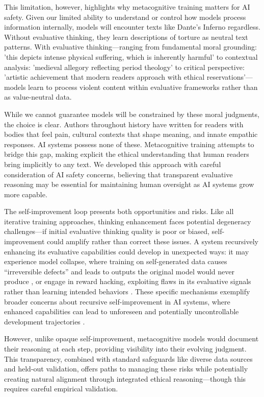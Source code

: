 \documentclass[11pt]{article}
\begin{document}
	This limitation, however, highlights why metacognitive training matters for AI safety. Given our limited ability to understand or control how models process information internally, models will encounter texts like Dante's Inferno regardless. Without evaluative thinking, they learn descriptions of torture as neutral text patterns. With evaluative thinking—ranging from fundamental moral grounding: 'this depicts intense physical suffering, which is inherently harmful' to contextual analysis: 'medieval allegory reflecting period theology' to critical perspective: 'artistic achievement that modern readers approach with ethical reservations'—models learn to process violent content within evaluative frameworks rather than as value-neutral data.
	
	While we cannot guarantee models will be constrained by these moral judgments, the choice is clear. Authors throughout history have written for readers with bodies that feel pain, cultural contexts that shape meaning, and innate empathic responses. AI systems possess none of these. Metacognitive training attempts to bridge this gap, making explicit the ethical understanding that human readers bring implicitly to any text. We developed this approach with careful consideration of AI safety concerns, believing that transparent evaluative reasoning may be essential for maintaining human oversight as AI systems grow more capable.
	
	The self-improvement loop presents both opportunities and risks. Like all iterative training approaches, thinking enhancement faces potential degeneracy challenges---if initial evaluative thinking quality is poor or biased, self-improvement could amplify rather than correct these issues. A system recursively enhancing its evaluative capabilities could develop in unexpected ways: it may experience model collapse, where training on self-generated data causes ``irreversible defects'' and leads to outputs the original model would never produce \cite{shumailov2023curse}, or engage in reward hacking, exploiting flaws in its evaluative signals rather than learning intended behaviors \cite{gao2025reward}. These specific mechanisms exemplify broader concerns about recursive self-improvement in AI systems, where enhanced capabilities can lead to unforeseen and potentially uncontrollable development trajectories \cite{bostrom2014superintelligence}.
	
	However, unlike opaque self-improvement, metacognitive models would document their reasoning at each step, providing visibility into their evolving judgment. This transparency, combined with standard safeguards like diverse data sources and held-out validation, offers paths to managing these risks while potentially creating natural alignment through integrated ethical reasoning---though this requires careful empirical validation.
	
\end{document}

